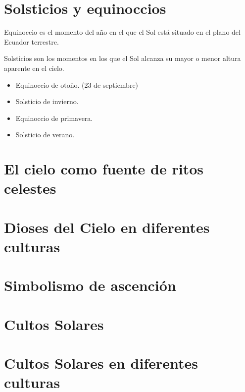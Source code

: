 \documentclass{report}
\begin{document}
\section*{Solsticios y equinoccios}

Equinoccio es el momento del a\~no en el que el Sol est\'a situado en
el plano del Ecuador terrestre.

Solsticios son los momentos en los que el Sol alcanza su mayor o menor
altura aparente en el cielo.

\begin{itemize}
\item Equinoccio de oto\~no. (23 de septiembre)
\item Solsticio de invierno.
\item Equinoccio de primavera.
\item Solsticio de verano.
\end{itemize}

\section*{El cielo como fuente de ritos celestes}

\section*{Dioses del Cielo en diferentes culturas}

\section*{Simbolismo de ascenci\'on}

\section*{Cultos Solares}

\section*{Cultos Solares en diferentes culturas}

\section*{}
\end{document}
